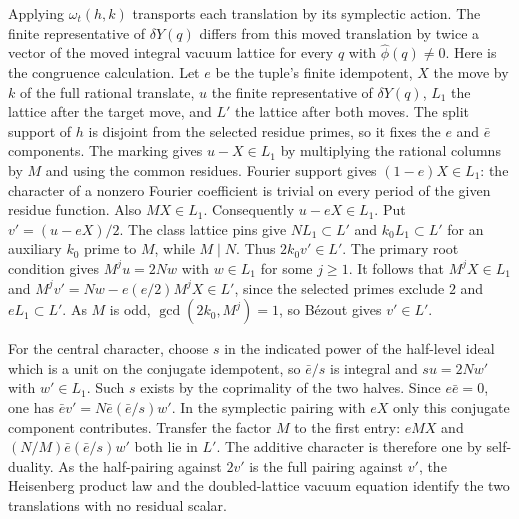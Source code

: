 Applying $\omega_t(h,k)$ transports each translation by its
symplectic action. The finite representative of $\delta Y(q)$
differs from this moved translation by twice a vector of the moved
integral vacuum lattice for every $q$ with $\widehat\phi(q)\ne0$.
Here is the congruence calculation. Let $e$ be the tuple's finite
idempotent, $X$ the move by $k$ of the full rational translate, $u$
the finite representative of $\delta Y(q)$, $L_1$ the lattice after
the target move, and $L'$ the lattice after both moves. The split
support of $h$ is disjoint from the selected residue primes, so it
fixes the $e$ and $\bar e$ components. The marking gives
$u-X\in L_1$ by multiplying the rational columns by $M$ and using
the common residues. Fourier support gives $(1-e)X\in L_1$: the
character of a nonzero Fourier coefficient is trivial on every
period of the given residue function. Also $MX\in L_1$. Consequently
$u-eX\in L_1$. Put $v'=(u-eX)/2$. The class lattice pins give
$N L_1\subset L'$ and $k_0L_1\subset L'$ for an auxiliary $k_0$
prime to $M$, while $M\mid N$. Thus $2k_0 v'\in L'$. The primary
root condition gives $M^j u=2Nw$ with $w\in L_1$ for some $j\ge1$.
It follows that $M^jX\in L_1$ and
$M^j v'=Nw-e(e/2)M^jX\in L'$, since the selected primes
exclude $2$ and $eL_1\subset L'$. As $M$ is odd,
$\gcd(2k_0,M^j)=1$, so B\'ezout gives $v'\in L'$.

For the central character, choose $s$ in the indicated power of the
half-level ideal which is a unit on the conjugate idempotent, so
$\bar e/s$ is integral and $su=2Nw'$ with $w'\in L_1$.
Such $s$ exists by the coprimality of the two halves. Since
$e\bar e=0$, one has
$\bar e v'=N\bar e(\bar e/s)w'$. In the symplectic pairing with
$eX$ only this conjugate component contributes. Transfer the factor
$M$ to the first entry: $eMX$ and
$(N/M)\bar e(\bar e/s)w'$ both lie in $L'$. The additive character
is therefore one by self-duality. As the half-pairing against
$2v'$ is the full pairing against $v'$, the Heisenberg product law
and the doubled-lattice vacuum equation identify the two
translations with no residual scalar.

